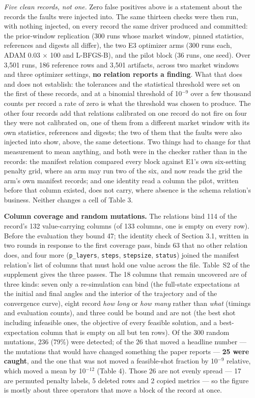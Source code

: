 \documentclass[acmsmall,screen,review]{acmart}
\begin{document}
\textit{Five clean records, not one.} Zero false positives above is a statement about the records the faults were injected into. The same thirteen checks were then run, with nothing injected, on every record the same driver produced and committed: the prior-window replication (300 runs whose market window, pinned statistics, references and digests all differ), the two E3 optimizer arms (300 runs each, ADAM 0.03 $\times$ 100 and L-BFGS-B), and the pilot block (36 runs, one seed). Over 3,501 runs, 186 reference rows and 3,501 artifacts, across two market windows and three optimizer settings, \textbf{no relation reports a finding}. What that does and does not establish: the tolerances and the statistical threshold were set on the first of these records, and at a binomial threshold of 10$^{-9}$ over a few thousand counts per record a rate of zero is what the threshold was chosen to produce. The other four records add that relations calibrated on one record do not fire on four they were not calibrated on, one of them from a different market window with its own statistics, references and digests; the two of them that the faults were also injected into show, above, the same detections. Two things had to change for that measurement to mean anything, and both were in the checker rather than in the records: the manifest relation compared every block against E1's own six-setting penalty grid, where an arm may run two of the six, and now reads the grid the arm's own manifest records; and one identity read a column the pilot, written before that column existed, does not carry, where absence is the schema relation's business. Neither changes a cell of Table 3.


\textbf{Column coverage and random mutations.} The relations bind 114 of the record's 132 value-carrying columns (of 133 columns, one is empty on every row). Before the evaluation they bound 47; the identity check of Section 3.1, written in two rounds in response to the first coverage pass, binds 63 that no other relation does, and four more (\texttt{p\_layers}, \texttt{steps}, \texttt{stepsize}, \texttt{status}) joined the manifest relation's list of columns that must hold one value across the file. Table~S2 of the supplement gives the three passes. The 18 columns that remain uncovered are of three kinds: seven only a re-simulation can bind (the full-state expectations at the initial and final angles and the interior of the trajectory and of the convergence curve), eight record \textit{how long} or \textit{how many} rather than \textit{what} (timings and evaluation counts), and three could be bound and are not (the best shot including infeasible ones, the objective of every feasible solution, and a best-expectation column that is empty on all but ten rows). Of the 300 random mutations, 236 (79\%) were detected; of the 26 that moved a headline number --- the mutations that would have changed something the paper reports --- \textbf{25 were caught}, and the one that was not moved a feasible-shot fraction by 10$^{-9}$ relative, which moved a mean by 10$^{-12}$ (Table 4). Those 26 are not evenly spread --- 17 are permuted penalty labels, 5 deleted rows and 2 copied metrics --- so the figure is mostly about three operators that move a block of the record at once.
\end{document}
